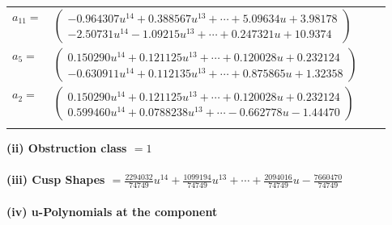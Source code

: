 \documentclass[1p]{elsarticle_modified}
\theoremstyle{definition}
\begin{document}
\begin{tabular}{m{7pt} m{180pt} m{7pt} m{180pt} }
\flushright $a_{11}=$&$\begin{pmatrix}-0.964307 u^{14}+0.388567 u^{13}+\cdots+5.09634 u+3.98178\\-2.50731 u^{14}-1.09215 u^{13}+\cdots+0.247321 u+10.9374\end{pmatrix}$ \\
\flushright $a_{5}=$&$\begin{pmatrix}0.150290 u^{14}+0.121125 u^{13}+\cdots+0.120028 u+0.232124\\-0.630911 u^{14}+0.112135 u^{13}+\cdots+0.875865 u+1.32358\end{pmatrix}$ \\
\flushright $a_{2}=$&$\begin{pmatrix}0.150290 u^{14}+0.121125 u^{13}+\cdots+0.120028 u+0.232124\\0.599460 u^{14}+0.0788238 u^{13}+\cdots-0.662778 u-1.44470\end{pmatrix}$\\&\end{tabular}
\flushleft \textbf{(ii) Obstruction class $= 1$}\\~\\
\flushleft \textbf{(iii) Cusp Shapes $= \frac{2294032}{74749} u^{14}+\frac{1099194}{74749} u^{13}+\cdots+\frac{2094016}{74749} u-\frac{7660470}{74749}$}\\~\\
\newpage\renewcommand{\arraystretch}{1}
\flushleft \textbf{(iv) u-Polynomials at the component}\newline \\
\end{document}
